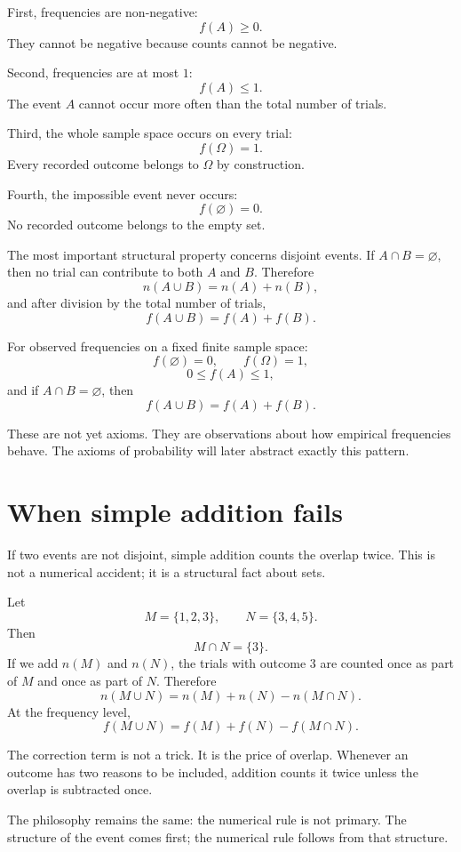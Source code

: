 First, frequencies are non-negative:
\[
f(A)\geq 0.
\]
They cannot be negative because counts cannot be negative.

Second, frequencies are at most \(1\):
\[
f(A)\leq 1.
\]
The event \(A\) cannot occur more often than the total number of trials.

Third, the whole sample space occurs on every trial:
\[
f(\Omega)=1.
\]
Every recorded outcome belongs to \(\Omega\) by construction.

Fourth, the impossible event never occurs:
\[
f(\varnothing)=0.
\]
No recorded outcome belongs to the empty set.

The most important structural property concerns disjoint events. If \(A\cap B=\varnothing\), then no trial can contribute to both \(A\) and \(B\). Therefore
\[
n(A\cup B)=n(A)+n(B),
\]
and after division by the total number of trials,
\[
f(A\cup B)=f(A)+f(B).
\]

\begin{theorembox}
For observed frequencies on a fixed finite sample space:
\[
f(\varnothing)=0,\qquad f(\Omega)=1,
\]
\[
0\leq f(A)\leq 1,
\]
and if \(A\cap B=\varnothing\), then
\[
f(A\cup B)=f(A)+f(B).
\]
\end{theorembox}

These are not yet axioms. They are observations about how empirical frequencies behave. The axioms of probability will later abstract exactly this pattern.

\section{When simple addition fails}

If two events are not disjoint, simple addition counts the overlap twice. This is not a numerical accident; it is a structural fact about sets.

Let
\[
M=\{1,2,3\},\qquad N=\{3,4,5\}.
\]
Then
\[
M\cap N=\{3\}.
\]
If we add \(n(M)\) and \(n(N)\), the trials with outcome \(3\) are counted once as part of \(M\) and once as part of \(N\). Therefore
\[
n(M\cup N)=n(M)+n(N)-n(M\cap N).
\]
At the frequency level,
\[
f(M\cup N)=f(M)+f(N)-f(M\cap N).
\]

\begin{remarkbox}
The correction term is not a trick. It is the price of overlap. Whenever an outcome has two reasons to be included, addition counts it twice unless the overlap is subtracted once.
\end{remarkbox}

The philosophy remains the same: the numerical rule is not primary. The structure of the event comes first; the numerical rule follows from that structure.
